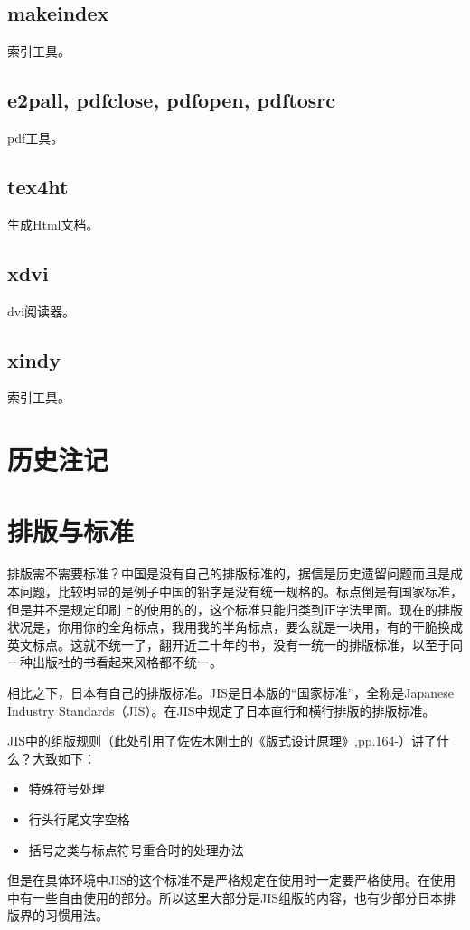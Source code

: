 \documentclass{article}
\begin{document}
\subsection{makeindex}
索引工具。
\subsection{e2pall, pdfclose, pdfopen, pdftosrc}
pdf工具。
\subsection{tex4ht}
生成Html文档。
\subsection{xdvi}
dvi阅读器。
\subsection{xindy}
索引工具。
\section{历史注记}
\section{排版与标准}
排版需不需要标准？中国是没有自己的排版标准的，据信是历史遗留问题而且是成本问题，比较明显的是例子中国的铅字是没有统一规格的。标点倒是有国家标准，但是并不是规定印刷上的使用的的，这个标准只能归类到正字法里面。现在的排版状况是，你用你的全角标点，我用我的半角标点，要么就是一块用，有的干脆换成英文标点。这就不统一了，翻开近二十年的书，没有一统一的排版标准，以至于同一种出版社的书看起来风格都不统一。

相比之下，日本有自己的排版标准。JIS是日本版的“国家标准”，全称是Japanese Industry Standards（JIS）。在JIS中规定了日本直行和横行排版的排版标准。

JIS中的组版规则（此处引用了佐佐木刚士的《版式设计原理》,pp.164-）讲了什么？大致如下：
\begin{itemize}
\item 特殊符号处理
\item 行头行尾文字空格
\item 括号之类与标点符号重合时的处理办法
\end{itemize}
但是在具体环境中JIS的这个标准不是严格规定在使用时一定要严格使用。在使用中有一些自由使用的部分。所以这里大部分是JIS组版的内容，也有少部分日本排版界的习惯用法。
\end{document}
